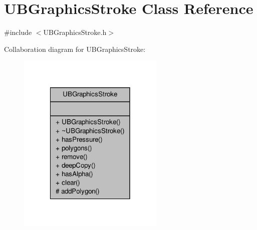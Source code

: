 \hypertarget{class_u_b_graphics_stroke}{\section{U\-B\-Graphics\-Stroke Class Reference}
\label{de/d75/class_u_b_graphics_stroke}
}


{\ttfamily \#include $<$U\-B\-Graphics\-Stroke.\-h$>$}



Collaboration diagram for U\-B\-Graphics\-Stroke\-:
\nopagebreak
\begin{figure}[H]
\begin{center}
\leavevmode
\includegraphics[width=198pt]{dc/d31/class_u_b_graphics_stroke__coll__graph}
\end{center}
\end{figure}
